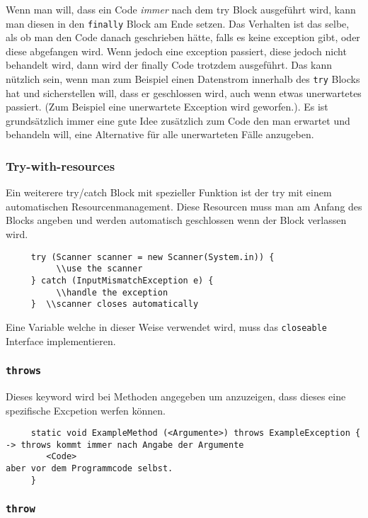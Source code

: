 \documentclass{article}
\begin{document}
	 Wenn man will, dass ein Code \textit{immer} nach dem try Block ausgeführt wird, kann man diesen in den \verb|finally| Block am Ende setzen. Das Verhalten ist das selbe, als ob man den Code danach geschrieben hätte, falls es keine exception gibt, oder diese abgefangen wird. Wenn jedoch eine exception passiert, diese jedoch nicht behandelt wird, dann wird der finally Code trotzdem ausgeführt. Das kann nützlich sein, wenn man zum Beispiel einen Datenstrom innerhalb des \verb|try| Blocks hat und sicherstellen will, dass er geschlossen wird, auch wenn etwas unerwartetes passiert. (Zum Beispiel eine unerwartete Exception wird geworfen.). Es ist grundsätzlich immer eine gute Idee zusätzlich zum Code den man erwartet und behandeln will, eine Alternative für alle unerwarteten Fälle anzugeben.  \\
	 \subsubsection{Try-with-resources}
	 Ein weiterere try/catch Block mit spezieller Funktion ist der try mit einem automatischen Resourcenmanagement. Diese Resourcen muss man am Anfang des Blocks angeben und werden automatisch geschlossen wenn der Block verlassen wird.
	 \begin{verbatim}
	 try (Scanner scanner = new Scanner(System.in)) {
	 	  \\use the scanner
	 } catch (InputMismatchException e) {
	 	  \\handle the exception
	 }  \\scanner closes automatically
	 \end{verbatim}
	 Eine Variable welche in dieser Weise verwendet wird, muss das \verb|closeable| Interface implementieren.
	 \cprotect\subsubsection{\texorpdfstring{\verb|throws|}{}}
	 Dieses keyword wird bei Methoden angegeben um anzuzeigen, dass dieses eine spezifische Excpetion werfen können.
	 \begin{verbatim}
	 static void ExampleMethod (<Argumente>) throws ExampleException { -> throws kommt immer nach Angabe der Argumente
	 	<Code> 	                                                          aber vor dem Programmcode selbst.
	 }
	 \end{verbatim}
	 \cprotect\subsubsection{\texorpdfstring{\verb|throw|}{}} 
\end{document}
